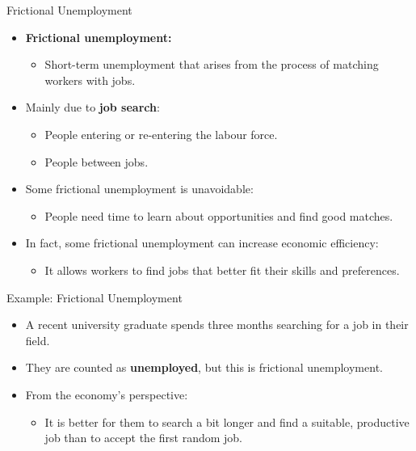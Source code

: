\documentclass[aspectratio=169]{beamer}
\begin{document}
\begin{frame}{Frictional Unemployment}
\transfade
\begin{itemize}
  \item \textbf{Frictional unemployment:}
  \begin{itemize}
    \item Short-term unemployment that arises from the process of matching workers with jobs.
  \end{itemize}
  \item Mainly due to \textbf{job search}:
  \begin{itemize}
    \item People entering or re-entering the labour force.
    \item People between jobs.
  \end{itemize}
  \item Some frictional unemployment is \alert{unavoidable}:
  \begin{itemize}
    \item People need time to learn about opportunities and find good matches.
  \end{itemize}
  \item In fact, some frictional unemployment can \alert{increase} economic efficiency:
  \begin{itemize}
    \item It allows workers to find jobs that better fit their skills and preferences.
  \end{itemize}
\end{itemize}
\end{frame}

\begin{frame}{Example: Frictional Unemployment}
\transfade
\begin{itemize}
  \item A recent university graduate spends three months searching for a job in their field.
  \item They are counted as \textbf{unemployed}, but this is frictional unemployment.
  \item From the economy’s perspective:
  \begin{itemize}
    \item It is better for them to search a bit longer and find a suitable, productive job than to accept the first random job.
  \end{itemize}
\end{itemize}
\end{frame}
\end{document}
